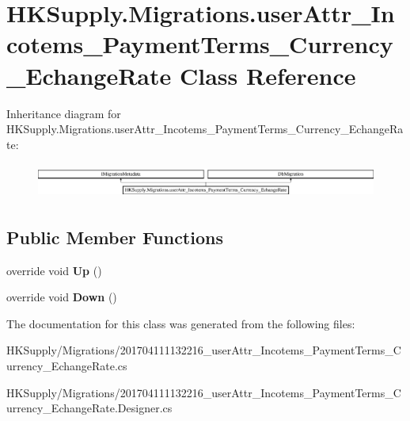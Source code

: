 \hypertarget{class_h_k_supply_1_1_migrations_1_1user_attr___incotems___payment_terms___currency___echange_rate}{}\section{H\+K\+Supply.\+Migrations.\+user\+Attr\+\_\+\+Incotems\+\_\+\+Payment\+Terms\+\_\+\+Currency\+\_\+\+Echange\+Rate Class Reference}
\label{class_h_k_supply_1_1_migrations_1_1user_attr___incotems___payment_terms___currency___echange_rate}
Inheritance diagram for H\+K\+Supply.\+Migrations.\+user\+Attr\+\_\+\+Incotems\+\_\+\+Payment\+Terms\+\_\+\+Currency\+\_\+\+Echange\+Rate\+:\begin{figure}[H]
\begin{center}
\leavevmode
\includegraphics[height=1.176471cm]{class_h_k_supply_1_1_migrations_1_1user_attr___incotems___payment_terms___currency___echange_rate}
\end{center}
\end{figure}
\subsection*{Public Member Functions}
\begin{DoxyCompactItemize}
\item 
\mbox{\label{class_h_k_supply_1_1_migrations_1_1user_attr___incotems___payment_terms___currency___echange_rate_a9a0c12a9bb4831fcd5db032fdf790bf9}} 
override void {\bfseries Up} ()
\item 
\mbox{\label{class_h_k_supply_1_1_migrations_1_1user_attr___incotems___payment_terms___currency___echange_rate_a6ace810965338038120065d6b34a5447}} 
override void {\bfseries Down} ()
\end{DoxyCompactItemize}


The documentation for this class was generated from the following files\+:\begin{DoxyCompactItemize}
\item 
H\+K\+Supply/\+Migrations/201704111132216\+\_\+user\+Attr\+\_\+\+Incotems\+\_\+\+Payment\+Terms\+\_\+\+Currency\+\_\+\+Echange\+Rate.\+cs\item 
H\+K\+Supply/\+Migrations/201704111132216\+\_\+user\+Attr\+\_\+\+Incotems\+\_\+\+Payment\+Terms\+\_\+\+Currency\+\_\+\+Echange\+Rate.\+Designer.\+cs\end{DoxyCompactItemize}
